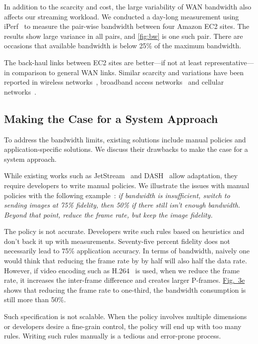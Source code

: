 In addition to the scarcity and cost, the large variability of WAN bandwidth
also affects our streaming workload. We conducted a day-long measurement using
iPerf~\cite{iperf3} to measure the pair-wise bandwidth between four Amazon EC2
sites. The results show large variance in all pairs, and \autoref{fig:bw} is one
such pair. There are occasions that available bandwidth is below 25\% of the
maximum bandwidth.

The back-haul links between EC2 sites are better---if not at least
representative---in comparison to general WAN links. Similar scarcity and
variations have been reported in wireless networks~\cite{biswas2015large},
broadband access networks~\cite{grover2013peeking, sundaresan2014bismark} and
cellular networks~\cite{nikravesh2014mobile}.

\subsection{Making the Case for a System Approach}
\label{sec:making-case-sys-approach}

To address the bandwidth limits, existing solutions include manual policies and
application-specific solutions. We discuss their drawbacks to make the case for
a system approach.

 While existing works such as
JetStream~\cite{rabkin2014aggregation} and DASH~\cite{sodagar2011mpeg} allow
adaptation, they require developers to write manual policies. We illustrate the
issues with manual policies with the following
example~\cite{rabkin2014aggregation}: \textit{if bandwidth is insufficient,
  switch to sending images at 75\% fidelity, then 50\% if there still isn't
  enough bandwidth. Beyond that point, reduce the frame rate, but keep the image
  fidelity.}

The policy is not accurate. Developers write such rules based on heuristics and
don't back it up with measurements. Seventy-five percent fidelity does not
necessarily lead to 75\% application accuracy. In terms of bandwidth, naively
one would think that reducing the frame rate by by half will also half the data
rate. However, if video encoding such as H.264~\cite{richardson2011h} is used,
when we reduce the frame rate, it increases the inter-frame difference and
creates larger P-frames. \hyperref[fig:app-specific]{Fig.~3e} shows that
reducing the frame rate to one-third, the bandwidth consumption is still more
than 50\%.

Such specification is not scalable. When the policy involves multiple dimensions
or developers desire a fine-grain control, the policy will end up with too many
rules.  Writing such rules manually is a tedious and error-prone process.

